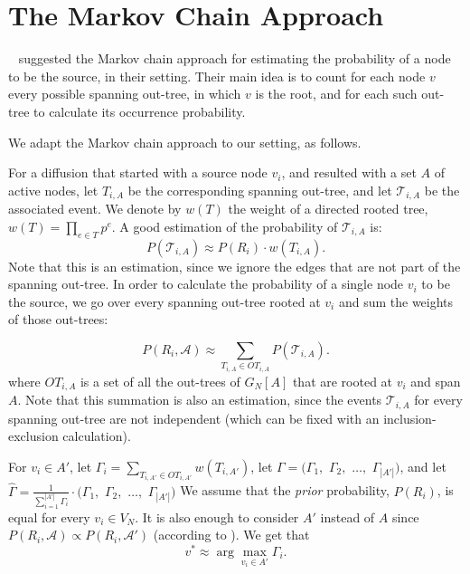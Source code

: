 \documentclass[sigconf,anonymous]{aamas}
\begin{document}
\section{The Markov Chain Approach}
\citeauthor{kumar2017temporally}~\cite{kumar2017temporally} suggested the Markov chain approach for estimating the probability of a node to be the source, in their setting.
Their main idea is to count for each node $v$ every possible spanning out-tree, in which $v$ is the root, and for each such out-tree to calculate its occurrence probability. 

We adapt the Markov chain approach to our setting, as follows.

For a diffusion that started with a source node $v_i$, and
resulted with a set $A$ of active nodes,  
let $T_{i,A}$ be the corresponding spanning out-tree, and let $\mathcal{T}_{i,A}$ be the associated event. We denote by $w(T)$ the weight of a directed rooted tree, $w(T) = \prod_{e\in T}p^e$.
A good estimation of the probability of $\mathcal{T}_{i,A}$ is:
$$
P(\mathcal{T}_{i,A}) \approx P(R_i)\cdot w(T_{i,A}).
$$
Note that this is an estimation, since we ignore the edges that are not part of the spanning out-tree. %
In order to calculate the probability of a single node $v_i$ to be the source, we go over every spanning out-tree rooted at $v_i$ and sum the weights of those out-trees:

$$
P(R_i,\mathcal{A}) \approx \sum _{T_{i,A}\in OT_{i,A}} P(\mathcal{T}_{i,A}).
$$
where $OT_{i,A}$ is a set of all the out-trees of $G_N[A]$ that are rooted at $v_i$ and span $A$. 
Note that this summation is also an estimation, since the events $\mathcal{T}_{i,A}$ for every spanning out-tree are not independent (which can be fixed with an inclusion-exclusion calculation).




For  $v_i \in A'$, let $\Gamma_i =  \sum _{T_{i,A'}\in OT_{i,A'}} w(T_{i,A'})$, let $\Gamma =(\Gamma_1,$ $ \Gamma_2,$ $\ldots,$ 
$\Gamma_{|A'|})$, 
and let $\hat{\Gamma} =
\frac{1}{\sum_{i=1}^{|A'|}\Gamma_i}\cdot 
(\Gamma_1,$ $ \Gamma_2,$ $\ldots,$ $\Gamma_{|A'|})$  
We assume that the \textit{prior} probability, $P(R_i)$, is equal for every $v_i\in V_N$. It is also enough to consider $A'$ instead of $A$ since $P(R_i,\mathcal{A}) \propto P(R_i,\mathcal{A'})$ (according to \cite{kumar2017temporally}). 
We get that
\begin{equation}
\label{eq: v* by spreading patterns}    
v^* \approx \arg\max_{v_i \in A'} \Gamma_i.
\end{equation}
\end{document}

